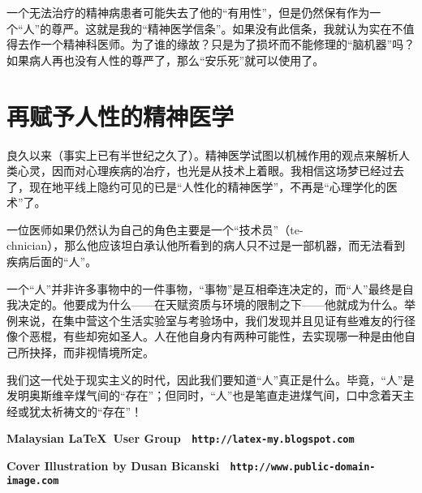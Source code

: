 \documentclass[11pt,oneside]{book}
\begin{document}
\begin{common-format}
一个无法治疗的精神病患者可能失去了他的“有用性”，但是仍然保有作为一个“人”的尊严。这就是我的“精神医学信条”。如果没有此信条，我就认为实在不值得去作一个精神科医师。为了谁的缘故？只是为了损坏而不能修理的“脑机器”吗？如果病人再也没有人性的尊严了，那么“安乐死”就可以使用了。


\section{再赋予人性的精神医学} 
良久以来（事实上已有半世纪之久了）。精神医学试图以机械作用的观点来解析人类心灵，因而对心理疾病的冶疗，也光是从技术上着眼。我相信这场梦已经过去了，现在地平线上隐约可见的已是“人性化的精神医学”，不再是“心理学化的医术”了。

一位医师如果仍然认为自己的角色主要是一个“技术员”（te-\\chnician），那么他应该坦白承认他所看到的病人只不过是一部机器，而无法看到疾病后面的“人”。

一个“人”并非许多事物中的一件事物，“事物”是互相牵连决定的，而“人”最终是自我决定的。他要成为什么——在天赋资质与环境的限制之下——他就成为什么。举例来说，在集中营这个生活实验室与考验场中，我们发现并且见证有些难友的行径像个恶棍，有些却宛如圣人。人在他自身内有两种可能性，去实现哪一种是由他自己所抉择，而非视情境所定。

我们这一代处于现实主义的时代，因此我们要知道“人”真正是什么。毕竟，“人”是发明奥斯维辛煤气间的“存在”；但同时，“人”也是笔直走进煤气间，口中念着天主经或犹太祈祷文的“存在”！






\newpage
\enlargethispage{3\baselineskip}
\thispagestyle{empty}



\begin{center}
\colorbox{white}{\EANisbn[SC4]}

\vspace*{\baselineskip}

\textbf{\textcolor{red!50}{Malaysian \LaTeX\ User Group \textbullet\ \texttt{http://latex-my.blogspot.com}}}

\textbf{\textcolor{red!50}{Cover Illustration by Dusan Bicanski \textbullet\ \texttt{http://www.public-domain-image.com}}}
\end{center}


\end{common-format}  
\end{document}
